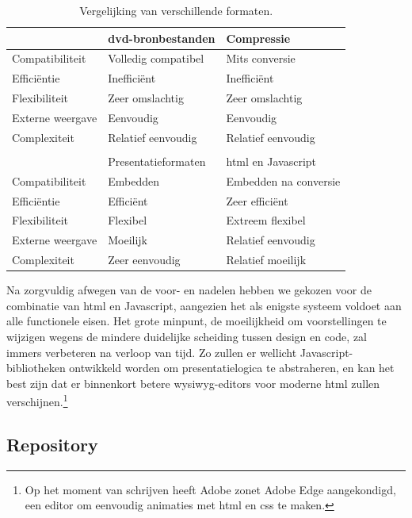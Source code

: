 \begin{table}[h!]
  \begin{center}
    \begin{tabular}{p{3cm} p{4cm} p{4cm}}
    & \acs{dvd}-bronbestanden & Compressie \\
    \hline
    Compatibiliteit & Volledig compatibel & Mits conversie \\
    Efficiëntie & Inefficiënt & Inefficiënt \\
    Flexibiliteit & Zeer omslachtig & Zeer omslachtig \\
    Externe weergave & Eenvoudig & Eenvoudig \\
    Complexiteit & Relatief eenvoudig & Relatief eenvoudig \\
    \\    
    & Presentatieformaten & \ac{html} en Javascript \\
    \hline
    Compatibiliteit & Embedden & Embedden na conversie \\
    Efficiëntie & Efficiënt & Zeer efficiënt \\
    Flexibiliteit & Flexibel & Extreem flexibel \\
    Externe weergave & Moeilijk & Relatief eenvoudig \\
    Complexiteit & Zeer eenvoudig & Relatief moeilijk \\
    \end{tabular}
  \end{center}
  \caption{Vergelijking van verschillende formaten.}
\end{table}

Na zorgvuldig afwegen van de voor- en nadelen hebben we gekozen voor de combinatie van \ac{html} en Javascript, aangezien het als enigste systeem voldoet aan alle functionele eisen. Het grote minpunt, de moeilijkheid om voorstellingen te wijzigen wegens de mindere duidelijke scheiding tussen design en code, zal immers verbeteren na verloop van tijd. Zo zullen er wellicht Javascript-bibliotheken ontwikkeld worden om presentatielogica te abstraheren, en kan het best zijn dat er binnenkort betere \ac{wysiwyg}-editors voor moderne \ac{html} zullen verschijnen.\footnote{Op het moment van schrijven heeft Adobe zonet Adobe Edge aangekondigd, een editor om eenvoudig animaties met \ac{html} en \ac{css} te maken.}

\subsection{Repository}

